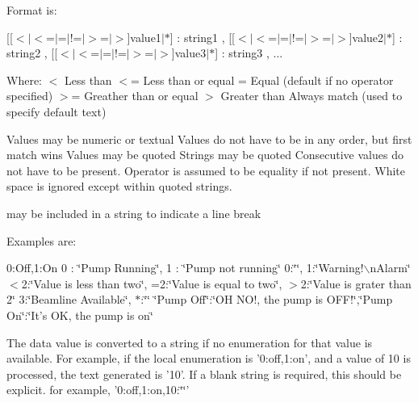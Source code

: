 Format is:

\mbox{[}\mbox{[}$<$$|$$<$=$|$=$|$!=$|$$>$=$|$$>$\mbox{]}value1$|$$\ast$\mbox{]} : string1 , \mbox{[}\mbox{[}$<$$|$$<$=$|$=$|$!=$|$$>$=$|$$>$\mbox{]}value2$|$$\ast$\mbox{]} : string2 , \mbox{[}\mbox{[}$<$$|$$<$=$|$=$|$!=$|$$>$=$|$$>$\mbox{]}value3$|$$\ast$\mbox{]} : string3 , ...

Where: $<$ Less than $<$= Less than or equal = Equal (default if no operator specified) $>$= Greather than or equal $>$ Greater than Always match (used to specify default text)

Values may be numeric or textual Values do not have to be in any order, but first match wins Values may be quoted Strings may be quoted Consecutive values do not have to be present. Operator is assumed to be equality if not present. White space is ignored except within quoted strings. \par
 may be included in a string to indicate a line break

Examples are:

0:Off,1:On 0 : \char`\"{}Pump Running\char`\"{}, 1 : \char`\"{}Pump not running\char`\"{} 0:\char`\"{}\char`\"{}, 1:\char`\"{}Warning!$\backslash$nAlarm\char`\"{} $<$2:\char`\"{}Value is less than two\char`\"{}, =2:\char`\"{}Value is equal to two\char`\"{}, $>$2:\char`\"{}Value is grater than 2\char`\"{} 3:\char`\"{}Beamline Available\char`\"{}, $\ast$:\char`\"{}\char`\"{} \char`\"{}Pump Off\char`\"{}:\char`\"{}OH NO!, the pump is OFF!\char`\"{},\char`\"{}Pump On\char`\"{}:\char`\"{}It's OK, the pump is on\char`\"{}

The data value is converted to a string if no enumeration for that value is available. For example, if the local enumeration is '0:off,1:on', and a value of 10 is processed, the text generated is '10'. If a blank string is required, this should be explicit. for example, '0:off,1:on,10:\char`\"{}\char`\"{}'

